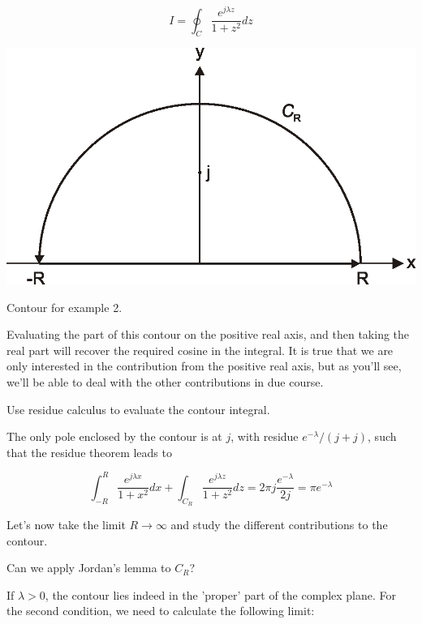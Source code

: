 \begin{equation}
I = \oint_{{C}} \frac{e^{j \lambda z}}{1 + z^2} dz
\end{equation}

\begin{marginfigure}
\centering
\includegraphics{complex/figures/int_ex_2}
\caption{Contour for example 2.}
\label{fig-example-2}
\end{marginfigure}

Evaluating the part of this contour on the positive real axis, and then taking the real part will recover the required cosine in the integral. It is true that we are only interested in the contribution from the positive real axis, but as you'll see, we'll be able to deal with the other contributions in due course.

\begin{cue}
Use residue calculus to evaluate the contour integral.
\end{cue}

The only pole enclosed by the contour is at $j$, with residue $e^{-\lambda}/(j+j)$, such that the residue theorem leads to

\begin{equation}
\int_{-R}^{R} \frac{e^{j \lambda x}}{1 + x^2} dx + \int_{{C_R}}
\frac{e^{j \lambda z}}{1 + z^2} dz = 2 \pi j \frac{e^{-\lambda}}{2 j} = \pi
e^{-\lambda}
\end{equation}

Let's now take the limit $R \to \infty$ and study the different contributions to the contour.

\begin{cue}
Can we apply Jordan's lemma to ${C_R}$? 
\end{cue}

If $\lambda > 0$, the contour lies indeed in the 'proper' part of the complex plane. For the second condition, we need to calculate the following limit:

